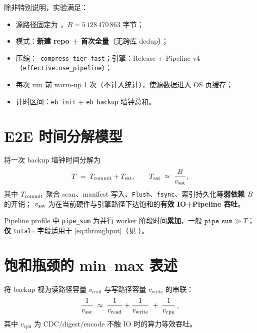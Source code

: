 \begin{assumption}
\label{asm:steady}
除非特别说明，实验满足：
\begin{itemize}[nosep]
  \item 源路径固定为 ，$B=5\,128\,470\,863$ 字节；
  \item 模式：\textbf{新建 repo + 首次全量}（无跨库 dedup）；
  \item 压缩：\texttt{--compress-tier fast}；引擎：Release + Pipeline v4（\texttt{effective.use\_pipeline}）；
  \item 每次 run 前 warm-up 1 次（不计入统计），使源数据进入 OS 页缓存；
  \item 计时区间：\texttt{eb init} + \texttt{eb backup} 墙钟总和。
\end{itemize}
\end{assumption}

\section{E2E 时间分解模型}\label{sec:decomposition}

\begin{definition}[两阶段 E2E 模型]
\label{def:two-phase}
将一次 backup 墙钟时间分解为
\begin{equation}
  T \;=\; T_{\mathrm{commit}} + T_{\mathrm{sat}},
  \qquad
  T_{\mathrm{sat}} \;\approx\; \frac{B}{v_{\mathrm{sat}}},
  \label{eq:two-phase}
\end{equation}
其中 $T_{\mathrm{commit}}$ 聚合 scan、manifest 写入、\texttt{Flush}、\texttt{fsync}、索引持久化等\textbf{弱依赖 $B$} 的开销；
$v_{\mathrm{sat}}$ 为在当前硬件与引擎路径下达饱和的\textbf{有效 IO+Pipeline 吞吐}。
\end{definition}

\begin{remark}
Pipeline profile 中 \texttt{pipe\_sum} 为并行 worker 阶段时间\textbf{累加}，一般 $ \texttt{pipe\_sum} \gg T$；
\textbf{仅} \texttt{total=} 字段适用于 \cref{eq:throughput}（见 ）。
\end{remark}

\section{饱和瓶颈的 min--max 表述}\label{sec:minmax}

将 backup 视为读路径容量 $v_{\mathrm{read}}$ 与写路径容量 $v_{\mathrm{write}}$ 的串联：
\begin{equation}
  \frac{1}{v_{\mathrm{sat}}} \;\approx\; \frac{1}{v_{\mathrm{read}}} + \frac{1}{v_{\mathrm{write}}}
  \;+\; \frac{1}{v_{\mathrm{cpu}}}\,,
  \label{eq:harmonic}
\end{equation}
其中 $v_{\mathrm{cpu}}$ 为 CDC/digest/encode 不触 IO 时的算力等效吞吐。

